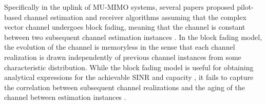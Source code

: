 \documentclass[conference, a4paper, 10pt]{IEEEtran}
\begin{document}
Specifically in the uplink of \ac{MU-MIMO} systems, several papers proposed pilot-based channel estimation and
receiver algorithms assuming that the complex vector channel undergoes block fading, meaning that the channel is
constant
between two subsequent channel estimation instances
\cite{Couillet:2012, Wen:2013, Hoydis:13, Mallik:18}.
In the block fading
model, the evolution of the channel is memoryless in the sense that each channel realization is drawn independently
of previous channel instances from some characteristic distribution. While the block fading model is useful for
obtaining analytical expressions for the achievable \ac{SINR} and capacity \cite{Hoydis:13, Hanlen:2012}, it fails
to capture the correlation between subsequent channel realizations and the aging of the channel between estimation
instances \cite{Truong:13, Kong:2015, Yuan:20, Fodor:21}.

\begin{comment}
The wireless channels in the uplink of \ac{MU-MIMO} systems can often be advantageously modelled as
\ac{AR} processes, because \ac{AR} channel models capture the time-varying (aging) nature of the channels and
facilitate channel estimation and prediction \cite{Yan:01, Zhang:07B, Lehmann:08, Abeida:10, Hijazi:10, GH:12,Truong:13,
Kong:2015, Chiu:15, Kashyap:17, Kim:20, Yuan:20, Fodor:21}.
\end{comment}
\end{document}

